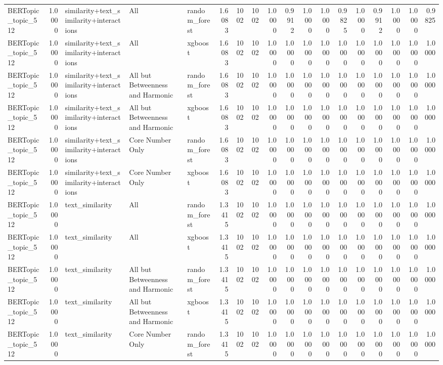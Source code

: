 \begin{tabular}{lrlllrrrrrrrrrrrrr}
BERTopic_topic_512 & 1.0000 & similarity+text_similarity+interactions & All & random_forest & 1.6083 & 1002 & 1002 & 1.0000 & 0.9912 & 1.0000 & 1.0000 & 0.9825 & 1.0000 & 0.9912 & 1.0000 & 1.0000 & 0.9825 \\
BERTopic_topic_512 & 1.0000 & similarity+text_similarity+interactions & All & xgboost & 1.6083 & 1002 & 1002 & 1.0000 & 1.0000 & 1.0000 & 1.0000 & 1.0000 & 1.0000 & 1.0000 & 1.0000 & 1.0000 & 1.0000 \\
BERTopic_topic_512 & 1.0000 & similarity+text_similarity+interactions & All but Betweenness and Harmonic & random_forest & 1.6083 & 1002 & 1002 & 1.0000 & 1.0000 & 1.0000 & 1.0000 & 1.0000 & 1.0000 & 1.0000 & 1.0000 & 1.0000 & 1.0000 \\
BERTopic_topic_512 & 1.0000 & similarity+text_similarity+interactions & All but Betweenness and Harmonic & xgboost & 1.6083 & 1002 & 1002 & 1.0000 & 1.0000 & 1.0000 & 1.0000 & 1.0000 & 1.0000 & 1.0000 & 1.0000 & 1.0000 & 1.0000 \\
BERTopic_topic_512 & 1.0000 & similarity+text_similarity+interactions & Core Number Only & random_forest & 1.6083 & 1002 & 1002 & 1.0000 & 1.0000 & 1.0000 & 1.0000 & 1.0000 & 1.0000 & 1.0000 & 1.0000 & 1.0000 & 1.0000 \\
BERTopic_topic_512 & 1.0000 & similarity+text_similarity+interactions & Core Number Only & xgboost & 1.6083 & 1002 & 1002 & 1.0000 & 1.0000 & 1.0000 & 1.0000 & 1.0000 & 1.0000 & 1.0000 & 1.0000 & 1.0000 & 1.0000 \\
BERTopic_topic_512 & 1.0000 & text_similarity & All & random_forest & 1.3415 & 1002 & 1002 & 1.0000 & 1.0000 & 1.0000 & 1.0000 & 1.0000 & 1.0000 & 1.0000 & 1.0000 & 1.0000 & 1.0000 \\
BERTopic_topic_512 & 1.0000 & text_similarity & All & xgboost & 1.3415 & 1002 & 1002 & 1.0000 & 1.0000 & 1.0000 & 1.0000 & 1.0000 & 1.0000 & 1.0000 & 1.0000 & 1.0000 & 1.0000 \\
BERTopic_topic_512 & 1.0000 & text_similarity & All but Betweenness and Harmonic & random_forest & 1.3415 & 1002 & 1002 & 1.0000 & 1.0000 & 1.0000 & 1.0000 & 1.0000 & 1.0000 & 1.0000 & 1.0000 & 1.0000 & 1.0000 \\
BERTopic_topic_512 & 1.0000 & text_similarity & All but Betweenness and Harmonic & xgboost & 1.3415 & 1002 & 1002 & 1.0000 & 1.0000 & 1.0000 & 1.0000 & 1.0000 & 1.0000 & 1.0000 & 1.0000 & 1.0000 & 1.0000 \\
BERTopic_topic_512 & 1.0000 & text_similarity & Core Number Only & random_forest & 1.3415 & 1002 & 1002 & 1.0000 & 1.0000 & 1.0000 & 1.0000 & 1.0000 & 1.0000 & 1.0000 & 1.0000 & 1.0000 & 1.0000 \\

\end{tabular}
